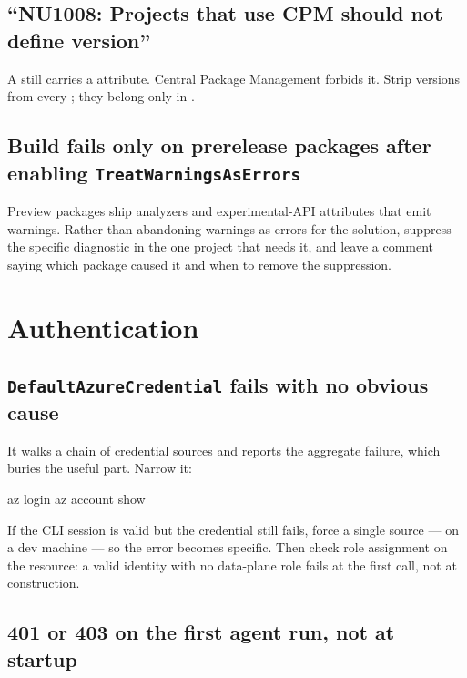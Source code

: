 \subsection{``NU1008: Projects that use CPM should not define version''}

A  still carries a  attribute. Central
Package Management forbids it. Strip versions from every ; they
belong only in .

\subsection{Build fails only on prerelease packages after enabling \texttt{TreatWarningsAsErrors}}

Preview packages ship analyzers and experimental-API attributes that emit
warnings. Rather than abandoning warnings-as-errors for the solution, suppress
the specific diagnostic in the one project that needs it, and leave a comment
saying which package caused it and when to remove the suppression.

\section{Authentication}

\subsection{\texttt{DefaultAzureCredential} fails with no obvious cause}

It walks a chain of credential sources and reports the aggregate failure, which
buries the useful part. Narrow it:

\begin{shellcmd}
az login
az account show
\end{shellcmd}

If the CLI session is valid but the credential still fails, force a single source
---  on a dev machine --- so the error becomes specific.
Then check role assignment on the resource: a valid identity with no data-plane
role fails at the first call, not at construction.

\subsection{401 or 403 on the first agent run, not at startup}

